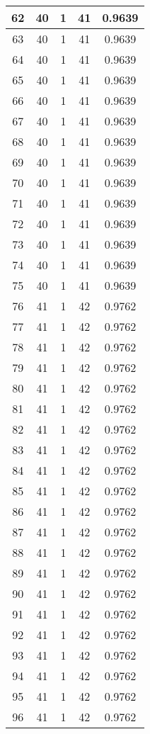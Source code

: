 \documentclass[letterpaper, 12pt]{article}
\begin{document}
\begin{longtable}{|c|c|c|c|c|}
\hline
62 & 40 & 1 & 41 & 0.9639 \\
\hline
63 & 40 & 1 & 41 & 0.9639 \\
\hline
64 & 40 & 1 & 41 & 0.9639 \\
\hline
65 & 40 & 1 & 41 & 0.9639 \\
\hline
66 & 40 & 1 & 41 & 0.9639 \\
\hline
67 & 40 & 1 & 41 & 0.9639 \\
\hline
68 & 40 & 1 & 41 & 0.9639 \\
\hline
69 & 40 & 1 & 41 & 0.9639 \\
\hline
70 & 40 & 1 & 41 & 0.9639 \\
\hline
71 & 40 & 1 & 41 & 0.9639 \\
\hline
72 & 40 & 1 & 41 & 0.9639 \\
\hline
73 & 40 & 1 & 41 & 0.9639 \\
\hline
74 & 40 & 1 & 41 & 0.9639 \\
\hline
75 & 40 & 1 & 41 & 0.9639 \\
\hline
76 & 41 & 1 & 42 & 0.9762 \\
\hline
77 & 41 & 1 & 42 & 0.9762 \\
\hline
78 & 41 & 1 & 42 & 0.9762 \\
\hline
79 & 41 & 1 & 42 & 0.9762 \\
\hline
80 & 41 & 1 & 42 & 0.9762 \\
\hline
81 & 41 & 1 & 42 & 0.9762 \\
\hline
82 & 41 & 1 & 42 & 0.9762 \\
\hline
83 & 41 & 1 & 42 & 0.9762 \\
\hline
84 & 41 & 1 & 42 & 0.9762 \\
\hline
85 & 41 & 1 & 42 & 0.9762 \\
\hline
86 & 41 & 1 & 42 & 0.9762 \\
\hline
87 & 41 & 1 & 42 & 0.9762 \\
\hline
88 & 41 & 1 & 42 & 0.9762 \\
\hline
89 & 41 & 1 & 42 & 0.9762 \\
\hline
90 & 41 & 1 & 42 & 0.9762 \\
\hline
91 & 41 & 1 & 42 & 0.9762 \\
\hline
92 & 41 & 1 & 42 & 0.9762 \\
\hline
93 & 41 & 1 & 42 & 0.9762 \\
\hline
94 & 41 & 1 & 42 & 0.9762 \\
\hline
95 & 41 & 1 & 42 & 0.9762 \\
\hline
96 & 41 & 1 & 42 & 0.9762 \\

\end{longtable}
\end{document}

